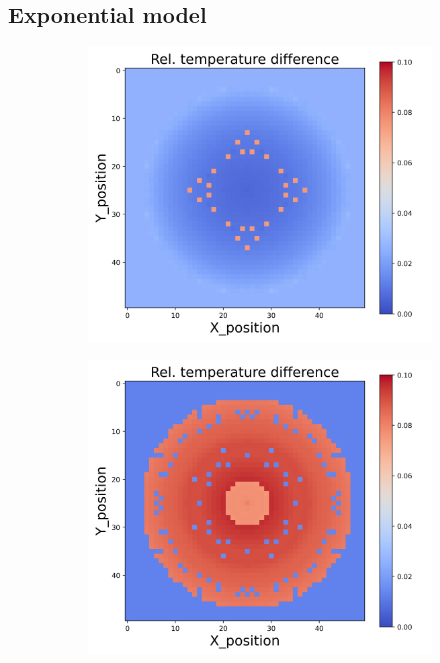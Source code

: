 {\subsection{Exponential model}
\begin{figure}[h]
    \centering
    \begin{minipage}{\textwidth}
        \centering
        \begin{subfigure}{0.27\textwidth}
            \centering
            \includegraphics[width=\textwidth]{figures/raw_data/0/exp/T_bias.jpg}
        \end{subfigure}
        \begin{subfigure}{0.27\textwidth}
            \centering
            \includegraphics[width=\textwidth]{figures/raw_data/5/exp/T_bias.jpg}

\end{subfigure}
\end{minipage}
\end{figure}}
